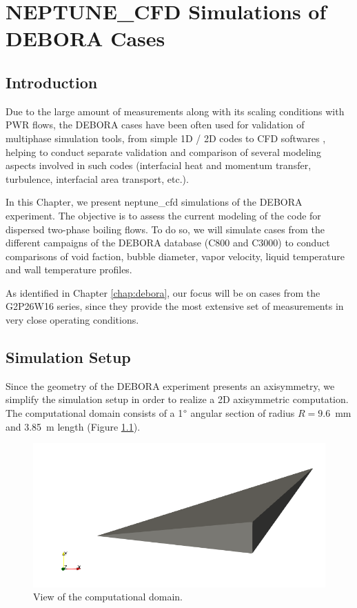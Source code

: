 \chapter{NEPTUNE\_CFD Simulations of DEBORA Cases}
\label{chap:debora_ncfd}

\minitoc

\section{Introduction}

Due to the large amount of measurements along with its scaling conditions with PWR flows, the DEBORA cases have been often used for validation of multiphase simulation tools, from simple 1D / 2D codes \cite{kledy_toward_2021, gueguen_contribution_2013, manon_contribution_2000} to CFD softwares \cite{bestion_review_2008, guelfi_neptune_2007, ruyer_modelisation_2009, montout_contribution_2009, lavieville_generalized_2017}, helping to conduct separate validation and comparison of several modeling aspects involved in such codes (interfacial heat and momentum transfer, turbulence, interfacial area transport, etc.). 

\npar

In this Chapter, we present neptune\_cfd simulations of the DEBORA experiment. The objective is to assess the current modeling of the code for dispersed two-phase boiling flows. To do so, we will simulate cases from the different campaigns of the DEBORA database (C800 and C3000) to conduct comparisons of void faction, bubble diameter, vapor velocity, liquid temperature and wall temperature profiles.

\npar

As identified in Chapter \ref{chap:debora}, our focus will be on cases from the G2P26W16 series, since they provide the most extensive set of measurements in very close operating conditions.


\section{Simulation Setup}

Since the geometry of the DEBORA experiment presents an axisymmetry, we simplify the simulation setup in order to realize a 2D axisymmetric computation. The computational domain consists of a 1$\degree$ angular section of radius $R=9.6$\ mm and 3.85\ m length (Figure \ref{fig:deb_cfd_domain}).


\begin{figure}[!h]
\centering
\includegraphics[width=0.6\linewidth]{img/DEBORA/cfd/msh/domain.png}
\caption{View of the computational domain.}
\label{fig:deb_cfd_domain}
\end{figure}


